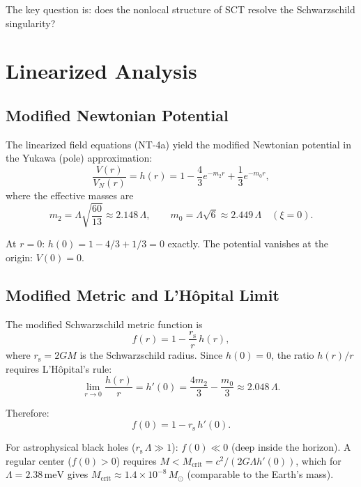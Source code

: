 \documentclass[11pt,a4paper]{article}
\theoremstyle{definition}
\theoremstyle{remark}
\newcommand{\Lam}{\Lambda}
\newcommand{\rs}{r_{\mathrm{s}}}
\begin{document}
The key question is: does the nonlocal structure of SCT resolve the Schwarzschild singularity?

\section{Linearized Analysis}

\subsection{Modified Newtonian Potential}

The linearized field equations (NT-4a) yield the modified Newtonian potential in the
Yukawa (pole) approximation:
\begin{equation}\label{eq:potential}
  \frac{V(r)}{V_N(r)} = h(r) = 1 - \frac{4}{3}e^{-m_2 r} + \frac{1}{3}e^{-m_0 r},
\end{equation}
where the effective masses are
\begin{equation}
  m_2 = \Lam\sqrt{\frac{60}{13}} \approx 2.148\,\Lam, \qquad
  m_0 = \Lam\sqrt{6} \approx 2.449\,\Lam \quad (\xi = 0).
\end{equation}

At $r = 0$: $h(0) = 1 - 4/3 + 1/3 = 0$ exactly. The potential vanishes at the origin:
$V(0) = 0$.

\subsection{Modified Metric and L'H\^opital Limit}

The modified Schwarzschild metric function is
\begin{equation}\label{eq:metric}
  f(r) = 1 - \frac{\rs}{r}\,h(r),
\end{equation}
where $\rs = 2GM$ is the Schwarzschild radius. Since $h(0) = 0$, the ratio
$h(r)/r$ requires L'H\^opital's rule:
\begin{equation}\label{eq:lhopital}
  \lim_{r\to 0}\frac{h(r)}{r} = h'(0) = \frac{4m_2}{3} - \frac{m_0}{3}
  \approx 2.048\,\Lam.
\end{equation}

Therefore:
\begin{equation}\label{eq:f_at_zero}
  f(0) = 1 - \rs\,h'(0).
\end{equation}

For astrophysical black holes ($\rs\,\Lam \gg 1$): $f(0) \ll 0$ (deep inside the horizon).
A regular center ($f(0) > 0$) requires $M < M_{\mathrm{crit}} = c^2/(2G\Lam h'(0))$,
which for $\Lam = 2.38\,\mathrm{meV}$ gives $M_{\mathrm{crit}} \approx 1.4 \times 10^{-8}\,M_\odot$
(comparable to the Earth's mass).
\end{document}

